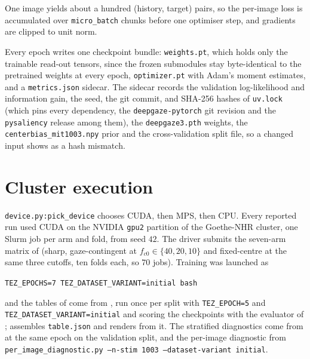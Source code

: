 One image yields about a hundred (history, target) pairs, so the per-image loss is accumulated over
\texttt{micro\_batch} chunks before one optimiser step, and gradients are clipped to unit norm.

Every epoch writes one checkpoint bundle: \texttt{weights.pt}, which holds only the trainable read-out
tensors, since the frozen submodules stay byte-identical to the pretrained weights at every epoch,
\texttt{optimizer.pt} with Adam's moment estimates, and a \texttt{metrics.json} sidecar. The sidecar
records the validation log-likelihood and information gain, the seed, the git commit, and
SHA-256 hashes of \texttt{uv.lock} (which pins every dependency, the \texttt{deepgaze-pytorch} git
revision and the \texttt{pysaliency} release among them), the \texttt{deepgaze3.pth} weights, the
\texttt{centerbias\_mit1003.npy} prior and the cross-validation split file, so a changed input shows as a
hash mismatch.

\section{Cluster execution}
\label{app:cluster}

\texttt{device.py:pick\_device} chooses CUDA, then MPS, then CPU. Every reported run used CUDA on the
NVIDIA \texttt{gpu2} partition of the Goethe-NHR cluster, one Slurm job per arm and fold, from seed $42$.
The driver  submits the seven-arm matrix of 
(sharp, gaze-contingent at $f_{c0} \in \{40, 20, 10\}$ and fixed-centre at the same three
cutoffs, ten folds each, so $70$ jobs). Training was launched as
\begin{center}
\texttt{TEZ\_EPOCHS=7 TEZ\_DATASET\_VARIANT=initial bash} 
\end{center}
and the tables of  come from , run once per split with
\texttt{TEZ\_EPOCH=5} and \texttt{TEZ\_DATASET\_VARIANT=initial} and scoring the checkpoints with the
evaluator of ;  assembles
\texttt{table.json} and  renders  from it. The stratified
diagnostics come from  at the same epoch on the validation split, and the
per-image diagnostic from \texttt{per\_image\_diagnostic.py --n-stim 1003 --dataset-variant initial}.
